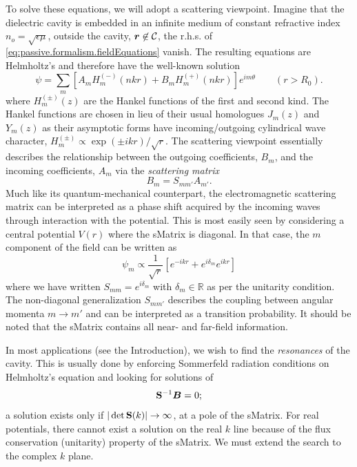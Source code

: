 To solve these equations, we will adopt a scattering viewpoint. 
Imagine that the dielectric cavity is embedded in an infinite
medium of constant refractive index  $n_o=\sqrt{\epsilon\mu}$, 
outside the cavity, $\boldsymbol{r}\not\in{\mathcal{C}}$, 
the r.h.s. of \eqref{eq:passive.formalism.fieldEquations} vanish. 
The resulting equations are Helmholtz's and therefore have the well-known solution
  \begin{equation}
    \label{eq:passive.formalism.hankelSolution}
    \psi = \sum_{m} \left[A_m H_m^{(-)}(nkr) + B_m H_m^{(+)}(nkr)\right]e^{im\theta} \qquad (r>R_0).
  \end{equation}
where $H_m^{(\pm)}(z)$ are the Hankel functions of the first
and second kind. The Hankel functions are chosen in lieu of their
usual homologues $J_m(z)$ and $Y_m(z)$ as their asymptotic forms 
have incoming/outgoing cylindrical wave character, 
$H_m^{(\pm)}\propto \exp(\pm ikr)/\sqrt{r}$. The scattering
viewpoint essentially describes the relationship between the 
outgoing coefficients, $B_m$, and the incoming coefficients, $A_m$
via the \textit{scattering matrix}
  \begin{equation}
    B_m = S_{mm'}A_{m'}. 
  \end{equation}
Much like its quantum-mechanical counterpart, the electromagnetic scattering
matrix can be interpreted as a phase shift acquired by the incoming
waves through interaction with the potential. This is most easily seen
by considering a central potential $V(r)$ where the \gls{sMatrix}
is diagonal. In that case, the $m$ component of the field can
be written as
  \begin{equation}
   \label{eq:passive.formalism.centralPotentialField}
   \psi_m \propto \frac{1}{\sqrt{r}}\left[e^{-ikr}+e^{i\delta_m}e^{ikr}\right]
  \end{equation}
where we have written $S_{mm}=e^{i\delta_m}$ with $\delta_m\in\mathbb{R}$ 
as per the unitarity condition. The non-diagonal
generalization $S_{mm'}$ describes the coupling between angular
momenta $m\rightarrow m'$ and can be interpreted as a transition
probability. 
It should be noted that the \gls{sMatrix} contains all near- and
far-field information. 

In most applications (see the Introduction), we wish to find the \textit{resonances} of the
cavity. This is usually done by enforcing Sommerfeld radiation conditions
on Helmholtz's equation and looking for solutions of
  \begin{equation}
   \label{eq:passive.formalism.resonanceCondition}
   \mathbf{S}^{-1}\boldsymbol{B}=0;
  \end{equation}
a solution exists only if $|\det{\mathbf{S}(k)}|\rightarrow\infty$, 
at a pole of the \gls{sMatrix}. 
For real potentials, there cannot exist a solution on the real $k$ line because
of the flux conservation (unitarity) property of the \gls{sMatrix}. We 
must extend the search to the complex $k$ plane.

